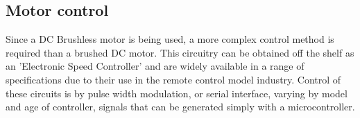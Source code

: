 \documentclass[journal,10pt]{IEEEtran}
\begin{document}
	\subsection{Motor control}
		Since a DC Brushless motor is being used, a more complex control method is required than a brushed DC motor.
		This circuitry can be obtained off the shelf as an 'Electronic Speed Controller' and are widely available in a range of specifications due to their use in the remote control model industry.
		Control of these circuits is by pulse width modulation, or serial interface, varying by model and age of controller, signals that can be generated simply with a microcontroller.
\end{document}
